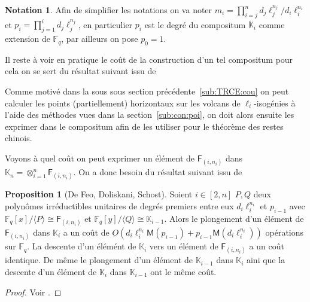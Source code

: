 \documentclass[10pt,a4paper]{book}
\theoremstyle{plain}
\theoremstyle{definition}
\theoremstyle{definition}
\theoremstyle{definition}
\newtheorem{prop}[thm]{Proposition}
\theoremstyle{definition}
\theoremstyle{remark}
\theoremstyle{remark}
\theoremstyle{definition}
\newtheorem{nota}[thm]{Notation}
\begin{document}
\begin{nota} Afin de simplifier les notations on va 
 noter $m_i=\prod_{i=j}^nd_j\ell_j^{n_j}/d_i\ell_i^{n_i}$ et 
 $p_{i}=\prod_{j=1}^{i}d_j\ell_j^{n_j}$, en particulier $p_{i}$ est le 
 degré du compositum $\mathbb{K}_i$ comme extension de $\mathbb{F}_q$, par 
 ailleurs on pose $p_0=1$.
\end{nota}

Il reste à voir en pratique le coût de la construction d'un tel compositum pour 
cela on se sert du résultat suivant issu de \cite[Theorem 1]{BostanFlajoletSalvySchost06}


 Comme motivé dans la sous sous section précédente~\ref{sub:TRCE:cou} on peut 
 calculer les points (partiellement) horizontaux sur les volcans de 
 $\ell_i$-isogénies à l'aide des méthodes vues dans la 
 section~\ref{sub:con:poi}, on doit alors ensuite les exprimer dans le
 compositum afin de les utiliser pour le théorème des restes chinois.
  
 Voyons à quel coût on peut exprimer un élément de $\mathsf{F}_{(i,n_i)}$ dans 
 $\mathbb{K}_n=\otimes_{i=1}^n\mathsf{F}_{(i,n_i)}$. On a donc 
 besoin du résultat suivant issu de \cite[Theorem 1]{DeFeoDoliskaniSchost14}
 \begin{prop}[De Feo, Doliskani, Schost]
 \label{pro:com:inj}
 Soient $i \in [2,n] $ $P,Q$ deux polynômes irréductibles unitaires de degrés 
 premiers entre eux $d_i\ell_i^{n_i}$ et $p_{i-1}$ avec
   $\mathbb{F}_q[x]/\langle P \rangle \cong \mathsf{F}_{(i,n_i)}$ et 
   $\mathbb{F}_q[y]/\langle Q \rangle \cong \mathbb{K}_{i-1}$. Alors le 
   plongement d'un élément de $\mathsf{F}_{(i,n_i)} $  dans $\mathbb{K}_{i}$ a un
   coût de 
   $O(d_i\ell_i^{n_i}\mathsf{M}(p_{i-1})+p_{i-1}\mathsf{M}(d_i\ell_i^{n_i}))$ 
   opérations sur $\mathbb{F}_q$. La descente d'un élémént de $\mathbb{K}_{i} $
   vers un élément de $\mathsf{F}_{(i,n_i)}$  a un coût identique. 
   De même le plongement d'un élément de $\mathbb{K}_{i-1}$ dans 
   $\mathbb{K}_{i}$ aini que la descente d'un élément de $\mathbb{K}_{i}$ dans 
   $\mathbb{K}_{i-1}$ ont le même coût.
 \end{prop}

 \begin{proof}
 Voir \cite{DeFeoDoliskaniSchost14}.
\end{proof}  
\end{document}
